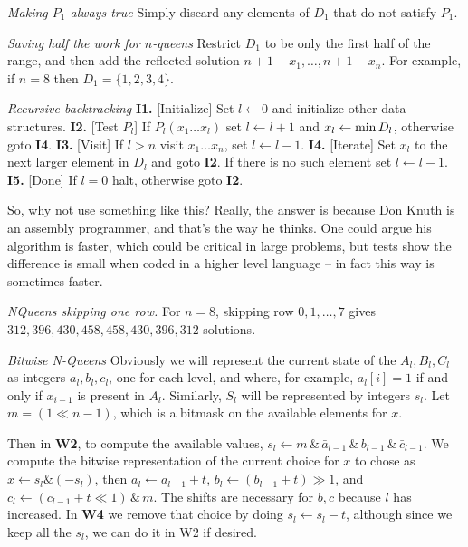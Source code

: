  {\it Making $P_1$ always true}\hfil\break
Simply discard any elements of $D_1$ that do not satisfy $P_1$.

 {\it Saving half the work for $n$-queens}\hfil\break
Restrict $D_1$ to be only the first half of the range, and then add the 
reflected solution $n + 1 - x_1, \ldots, n + 1 - x_n$.  For example, if $n = 8$
then $D_1 = \{1, 2, 3, 4\}$.

 {\it Recursive backtracking}\hfil\break
{\bf I1.} [Initialize] Set $l \leftarrow 0$ and initialize other data 
structures.\hfil\break
{\bf I2.} [Test $P_l$] If $P_l\left(x_1 \ldots x_l\right)$ set 
 $l \leftarrow l + 1$ and $x_l \leftarrow {\rm min}\,D_l$,
  otherwise goto {\bf I4}.\hfil\break 
{\bf I3.} [Visit] If $l > n$ visit $x_1 \ldots x_n$, set $l \leftarrow l-1$.
\hfil\break
{\bf I4.} [Iterate] Set $x_l$ to the next larger element in $D_l$ and goto 
 {\bf I2}. If there is no such element set $l \leftarrow l - 1$.\hfil\break
{\bf I5.} [Done] If $l=0$ halt, otherwise goto {\bf I2}.
\hfil\break

So, why not use something like this?  Really, the answer is because Don Knuth
is an assembly programmer, and that's the way he thinks.  One could argue his
algorithm is faster, which could be critical in large problems, but tests show
the difference is small when coded in a higher level language -- in fact this
way is sometimes faster.

 {\it NQueens skipping one row.}\hfil\break
For $n=8$, skipping row $0, 1, \ldots, 7$ gives ${312, 396,
430, 458, 458, 430, 396, 312}$ solutions.

 {\it Bitwise N-Queens}\hfil\break
Obviously we will represent the current state of the $A_l, B_l, C_l$ 
as integers $a_l, b_l, c_l$, one for each level, and where, for example, 
$a_l\left[i\right] = 1$ if and only if $x_{i-1}$ is present in $A_l$.  
Similarly, $S_l$ will be represented by integers $s_l$.  Let 
$m = \left(1 \ll {n-1}\right)$, which is a bitmask on the available elements
for $x$.

Then in {\bf W2}, to compute the available values,
$s_l \leftarrow m \,\&\, {\bar a_{l-1}} \,\&\, {\bar b_{l-1}} \,\&\, 
{\bar c_{l-1}}$. We compute the bitwise representation of the current choice 
for $x$ to chose as $x \leftarrow s_l \& \left(- s_l\right)$, then 
$a_l \leftarrow a_{l-1} + t$, $b_l \leftarrow \left(b_{l-1} + t\right) \gg 1$, 
and  $c_l \leftarrow \left( {c_{l-1} + t} \ll 1 \right) \,\&\, m$.  The shifts 
are necessary for $b, c$ because $l$ has increased.  In {\bf W4} we
remove that choice by doing $s_l \leftarrow s_l - t$, although since we keep
all the $s_l$, we can do it in W2 if desired.

